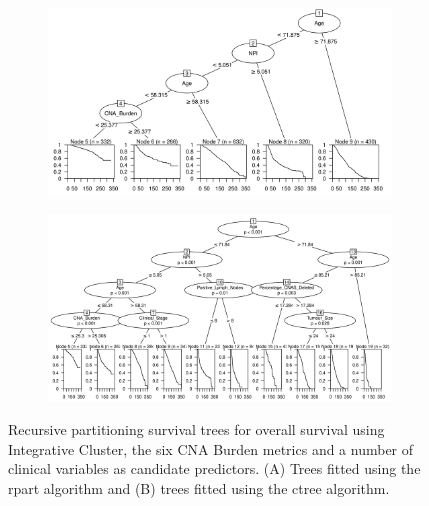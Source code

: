 \begin{figure}[!htb]
\centering

\vspace{1cm}

\begin{subfigure}{\textwidth}
\subcaption{}
\includegraphics[width=1\textwidth]{../figures/Appendices/Appendix_B/Clin_PartyKit_Survival_Burden_OS_INTCLUST.png}
\end{subfigure}

\vspace{2cm}

\begin{subfigure}{\textwidth}
\subcaption{}
\includegraphics[width=1\textwidth]{../figures/Appendices/Appendix_B/Clin_Ctree_Survival_Burden_OS_INTCLUST.png}
\end{subfigure}

\vspace{1cm}

\caption[Recursive partitioning survival trees for overall survival using Integrative Cluster, the six CNA Burden metrics and a number of clinical variables as candidate predictors.]{Recursive partitioning survival trees for overall survival using Integrative Cluster, the six CNA Burden metrics and a number of clinical variables as candidate predictors. (A) Trees fitted using the rpart algorithm and (B) trees fitted using the ctree algorithm.}
\end{figure}

